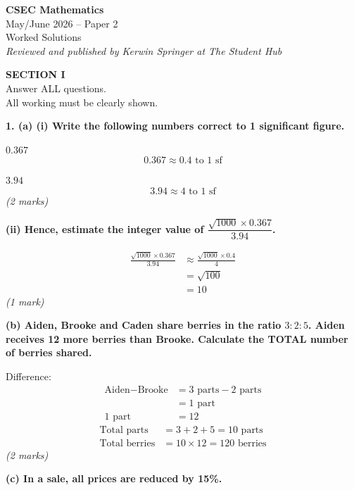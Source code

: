 \documentclass[12pt,a4paper]{article}
\newcommand{\qhead}[1]{\vspace{0.6em}\noindent\textbf{\large #1}\par\vspace{0.3em}}
\newcommand{\subhead}[1]{\vspace{0.3em}\noindent\textbf{#1}\par}
\newcommand{\qmarks}[1]{\hfill\textit{(#1)}}
\begin{document}
\thispagestyle{plain}
\begin{center}
\vspace*{2cm}
{\Huge\bfseries CSEC Mathematics}\\[1em]
{\LARGE May/June 2026 -- Paper 2}\\[1em]
{\LARGE Worked Solutions}\\[2em]
{\normalsize\itshape Reviewed and published by Kerwin Springer at The Student Hub}
\end{center}
\vfill
\newpage

\begin{center}
{\large\bfseries SECTION I}\\[0.4em]
Answer ALL questions.\\
All working must be clearly shown.
\end{center}

\qhead{1. (a) (i) Write the following numbers correct to 1 significant figure.}

$0.367$
\[ 0.367 \approx 0.4 \text{ to 1 sf} \]

$3.94$
\[ 3.94 \approx 4 \text{ to 1 sf} \]
\qmarks{2 marks}

\subhead{(ii) Hence, estimate the integer value of $\dfrac{\sqrt{1000}\times 0.367}{3.94}$.}
\begin{align*}
\frac{\sqrt{1000}\times 0.367}{3.94} &\approx \frac{\sqrt{1000}\times 0.4}{4} \\
&= \sqrt{100} \\
&= 10
\end{align*}
\qmarks{1 mark}

\subhead{(b) Aiden, Brooke and Caden share berries in the ratio $3:2:5$. Aiden receives 12 more berries than Brooke. Calculate the TOTAL number of berries shared.}

Difference:
\begin{align*}
\text{Aiden} - \text{Brooke} &= 3\text{ parts} - 2\text{ parts} \\
&= 1\text{ part} \\
1\text{ part} &= 12
\end{align*}
\begin{align*}
\text{Total parts} &= 3+2+5 = 10\text{ parts} \\
\text{Total berries} &= 10\times 12 = 120 \text{ berries}
\end{align*}
\qmarks{2 marks}

\subhead{(c) In a sale, all prices are reduced by 15\%.}
\end{document}

